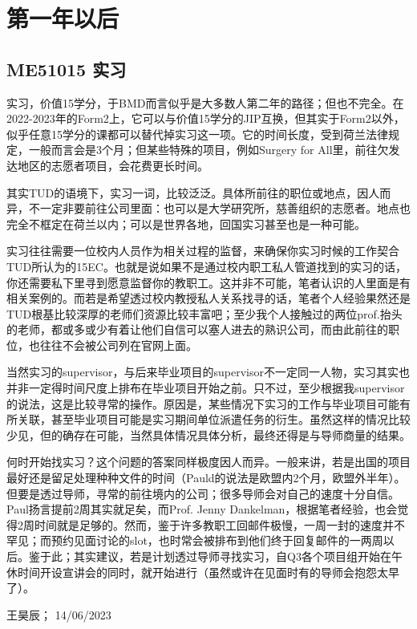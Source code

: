 \section{第一年以后}
\subsection{ME51015 实习}
实习，价值15学分，于BMD而言似乎是大多数人第二年的路径；但也不完全。在2022-2023年的Form2上，它可以与价值15学分的JIP互换，但其实于Form2以外，似乎任意15学分的课都可以替代掉实习这一项。它的时间长度，受到荷兰法律规定，一般而言会是3个月；但某些特殊的项目，例如Surgery for All里，前往欠发达地区的志愿者项目，会花费更长时间。

其实TUD的语境下，实习一词，比较泛泛。具体所前往的职位或地点，因人而异，不一定非要前往公司里面：也可以是大学研究所，慈善组织的志愿者。地点也完全不框定在荷兰以内；可以是世界各地，回国实习甚至也是一种可能。

实习往往需要一位校内人员作为相关过程的监督，来确保你实习时候的工作契合TUD所认为的15EC。也就是说如果不是通过校内职工私人管道找到的实习的话，你还需要私下里寻到愿意监督你的教职工。这并非不可能，笔者认识的人里面是有相关案例的。而若是希望透过校内教授私人关系找寻的话，笔者个人经验果然还是TUD根基比较深厚的老师们资源比较丰富吧；至少我个人接触过的两位prof.抬头的老师，都或多或少有着让他们自信可以塞人进去的熟识公司，而由此前往的职位，也往往不会被公司列在官网上面。

当然实习的supervisor，与后来毕业项目的supervisor不一定同一人物，实习其实也并非一定得时间尺度上排布在毕业项目开始之前。只不过，至少根据我supervisor的说法，这是比较寻常的操作。原因是，某些情况下实习的工作与毕业项目可能有所关联，甚至毕业项目可能是实习期间单位派遣任务的衍生。虽然这样的情况比较少见，但的确存在可能，当然具体情况具体分析，最终还得是与导师商量的结果。

何时开始找实习？这个问题的答案同样极度因人而异。一般来讲，若是出国的项目最好还是留足处理种种文件的时间（Pauld的说法是欧盟内2个月，欧盟外半年）。但要是透过导师，寻常的前往境内的公司；很多导师会对自己的速度十分自信。Paul扬言提前2周其实就足矣，而Prof. Jenny Dankelman，根据笔者经验，也会觉得2周时间就是足够的。然而，鉴于许多教职工回邮件极慢，一周一封的速度并不罕见；而预约见面讨论的slot，也时常会被排布到他们终于回复邮件的一两周以后。鉴于此；其实建议，若是计划透过导师寻找实习，自Q3各个项目组开始在午休时间开设宣讲会的同时，就开始进行（虽然或许在见面时有的导师会抱怨太早了）。
\begin{flushright}
王昊辰； 14/06/2023
\end{flushright}

